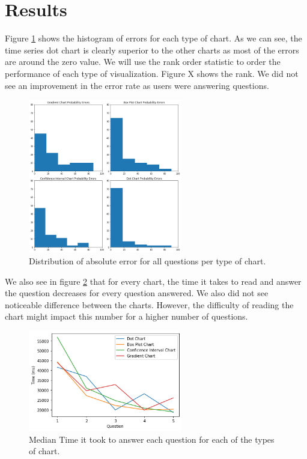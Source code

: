 \documentclass[a4paper,3p,sort&compress]{elsarticle}
\begin{document}
\section{Results}
\label{sec:results}

Figure \ref{figure:errors} shows the histogram of errors for each type of chart. As we can see, the time series dot chart is clearly superior to the other charts as most of the errors are around the zero value. We will use the rank order statistic to order the performance of each type of visualization. Figure X shows the rank. We did not see an improvement in the error rate as users were answering questions.

\begin{figure}
  \centering
  \includegraphics[width=0.6\textwidth]{probability_errors}
  \caption{\label{figure:errors}Distribution of absolute error for all questions per type of chart.}
\end{figure}

We also see in figure \ref{figure:duration} that for every chart, the time it takes to read and answer the question decreases for every question answered. We also did not see noticeable difference between the charts. However, the difficulty of reading the chart might impact this number for a higher number of questions.

\begin{figure}
  \centering
   \includegraphics[width=0.6\textwidth]{duration_evo}
  \caption{\label{figure:duration} Median Time it took to answer each question for each of the types of chart.}
\end{figure}  
\end{document}

